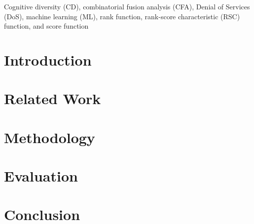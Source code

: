 \documentclass[conference]{IEEEtran}
\begin{document}
\begin{IEEEkeywords}
Cognitive diversity (CD), combinatorial fusion analysis (CFA), Denial of Services (DoS), machine learning (ML), rank function, rank-score characteristic (RSC) function, and score function
\end{IEEEkeywords}

\section{Introduction}  \label{sec:introduction}


\section{Related Work}  \label{sec:related}



\section{Methodology} \label{sec:methodology}  

\section{Evaluation}  \label{sec:evaluation}

\section{Conclusion}  \label{sec:conclusion}

\end{document}
